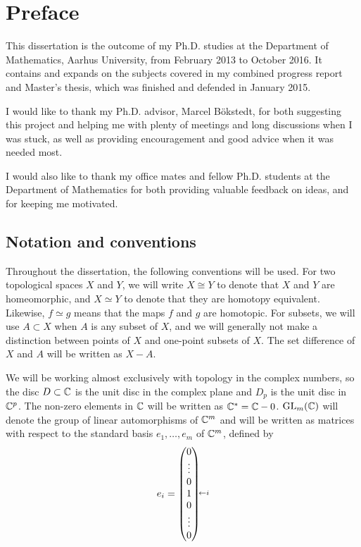 \chapter{Preface} 



This dissertation is the outcome of my Ph.D. studies at the Department
of Mathematics, Aarhus University, from February 2013 to October
2016. It contains and expands on the subjects covered in my combined
progress report and Master's thesis, which was finished and defended
in January 2015.

I would like to thank my Ph.D. advisor, Marcel B\"okstedt, for both
suggesting this project and helping me with plenty of meetings and long
discussions when I was stuck, as well as providing
encouragement and good advice when it was needed most.

I would also like to thank my office mates and fellow Ph.D. students
at the Department of Mathematics
for both providing valuable feedback on ideas, and for keeping me
motivated.


\section{Notation and conventions}

Throughout the dissertation, the following conventions will be used.
For two topological spaces $X$ and $Y$, we will write $X \cong Y$ to
denote that $X$ and $Y$ are homeomorphic, and $X\simeq Y$ to denote
that they are homotopy equivalent. Likewise, $f \simeq g$ means that
the maps $f$ and $g$ are homotopic. For subsets, we will use $A
\subset X$ when $A$ is any subset of $X$, and we will generally not
make a distinction between points of $X$ and one-point subsets of
$X$. The set difference of $X$ and $A$ will be written as $X-A$.

We will be working almost exclusively with topology in the complex
numbers,
so the disc $D\subset\mathbb{C}$ is the unit disc in the complex plane and
$D_p$ is the unit disc in $\mathbb{C}^p$. The non-zero elements in $\mathbb{C}$ will
be written as $\mathbb{C}^* = \mathbb{C} - 0$. $\operatorname{GL}_m(\mathbb{C})$ will denote the group of
linear automorphisms of $\mathbb{C}^m$ and will be written as matrices with
respect to the standard basis $e_1,\dots,e_m$ of $\mathbb{C}^m$,
defined by
\[ \xy (9,0.5)*{\scriptstyle\leftarrow i};
(0,0)*{e_i =
\begin{pmatrix}
  0 \\
  \vdots \\
  0 \\
  1 \\
  0 \\
  \vdots \\
  0
\end{pmatrix}}; \endxy
\]

